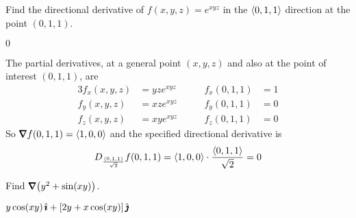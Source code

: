 


\subsection*{\Conceptual}



\begin{question}[M200 2008A] %
Find the directional derivative of $f(x,y,z) = e^{xyz}$ in the $\left< 0,1,1\right>$ 
direction at the point $(0,1,1)$.
\end{question}

%

\begin{answer}
$0$
\end{answer}

\begin{solution}
The partial derivatives, at a general point $(x,y,z)$ and
also at the point of interest $(0,1,1)$, are
\begin{alignat*}{3}
f_x(x,y,z)&=yz e^{xyz}\qquad &
   f_x(0,1,1)&= 1 \\
f_y(x,y,z)&=xz e^{xyz}\qquad &
   f_y(0,1,1)&= 0 \\
f_z(x,y,z)&=xy e^{xyz}\qquad &
   f_z(0,1,1)&= 0 
\end{alignat*}
So $\vnabla f(0,1,1) =\llt 1,0,0\rgt$ and the specified directional derivative
is
\begin{align*}
D_{\frac{\left< 0,1,1\right>}{\sqrt{2}}}f(0,1,1)
=\left< 1,0,0\right>\cdot\frac{\left< 0,1,1\right>}{\sqrt{2}}
=0
\end{align*}
\end{solution}

\begin{question}[M200 2008A] %
Find $\vnabla\big(y^2 + \sin(xy)\big)$.
\end{question}

%

\begin{answer}
$y\cos(xy)\,\hat{\pmb{\imath}} +  [2y + x\cos(xy)]\,\hat{\pmb{\jmath}}$
\end{answer}

